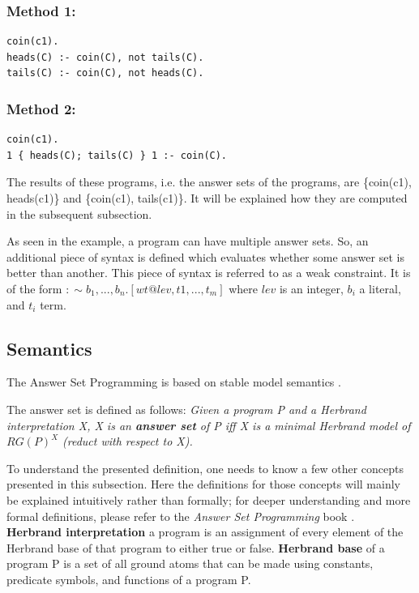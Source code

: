 \subsubsection{Method 1:}
\begin{verbatim}
coin(c1).
heads(C) :- coin(C), not tails(C).
tails(C) :- coin(C), not heads(C).
\end{verbatim}
\subsubsection{Method 2:}
\begin{verbatim}
coin(c1).
1 { heads(C); tails(C) } 1 :- coin(C).
\end{verbatim}

The results of these programs, i.e. the answer sets of the programs, are \{coin(c1), heads(c1)\} and \{coin(c1), tails(c1)\}.
It will be explained how they are computed in the subsequent subsection.

As seen in the example, a program can have multiple answer sets.
So, an additional piece of syntax is defined which evaluates whether some answer set is better than another.
This piece of syntax is referred to as a weak constraint.
It is of the form $:\sim {} b_1,..., b_n.[wt@lev, t1, ..., t_m]$
where $lev$ is an integer, $b_i$ a literal, and $t_i$ term.

\subsection{Semantics}

The Answer Set Programming is based on stable model semantics \cite{RefWorks:RefID:21-fitting1992michael}.

The answer set is defined as follows: 
\emph{Given a program P and a Herbrand interpretation X, X is an \textbf{answer set} of P iff X is a minimal Herbrand model of $RG(P)^X$ (reduct with respect to X).}

To understand the presented definition, one needs to know a few other concepts presented in this subsection.
Here the definitions for those concepts will mainly be explained intuitively rather than formally; for deeper understanding and more formal definitions, please refer to the \emph{Answer Set Programming} book \cite{RefWorks:RefID:23-lifschitz2019answer}. \\

\textbf{Herbrand interpretation} a program is an assignment of every element of the Herbrand base of that program to either true or false. \textbf{Herbrand base} of a program P is a set of all ground atoms that can be made using constants, predicate symbols, and functions of a program P.\\


